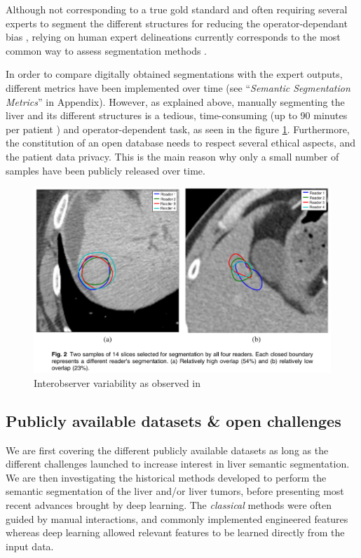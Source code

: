 \documentclass[]{article}
\begin{document}
Although not corresponding to a true gold standard \cite{Heimann2009} and often requiring several experts to segment the
different structures for reducing the operator-dependant bias \cite{Echegaray2015, Moltz2009}, relying on human expert
delineations currently corresponds to the most common way to assess
segmentation methods \cite{Bilic2019}.

In order to compare digitally obtained segmentations with the expert
outputs, different metrics have been implemented over time (see
``\emph{Semantic Segmentation Metrics}'' in Appendix). However, as
explained above, manually segmenting the liver and its different
structures is a tedious, time-consuming (up to 90 minutes per patient
\cite{Gotra2017}) and operator-dependent task, as seen in the figure \ref{interobserver_var}.
Furthermore, the constitution of an open database needs to respect
several ethical aspects, and the patient data privacy. This is the main
reason why only a small number of samples have been publicly released
over time.

\begin{figure}[!h]
    \centering        
    \includegraphics[width=\linewidth]{./images/image37.png}
    \caption{Interobserver variability as observed in \cite{Echegaray2015}}
    \label{interobserver_var}
\end{figure} 

\subsection*{Publicly available datasets \& open challenges}

We are first covering the different publicly available datasets as long
as the different challenges launched to increase interest in liver
semantic segmentation. We are then investigating the historical methods
developed to perform the semantic segmentation of the liver and/or liver
tumors, before presenting most recent advances brought by deep learning.
The \emph{classical }methods were often guided by manual interactions,
and commonly implemented engineered features whereas deep learning
allowed relevant features to be learned directly from the input data.
\end{document}
